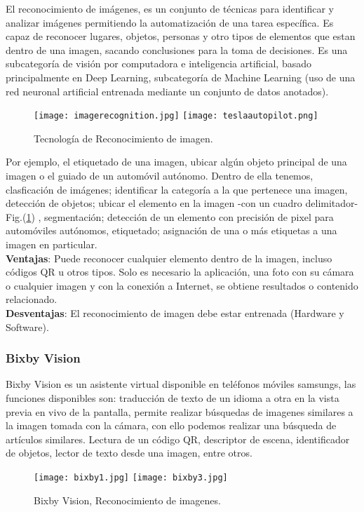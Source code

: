 El reconocimiento de imágenes, es un conjunto de técnicas para identificar y analizar imágenes permitiendo la automatización de una tarea específica. Es capaz de reconocer lugares, objetos, personas y otro tipos de elementos que estan dentro de una imagen, sacando conclusiones para la toma de decisiones. Es una subcategoría de visión por computadora e inteligencia artificial, basado principalmente en Deep Learning, subcategoría de Machine Learning (uso de una red neuronal artificial entrenada mediante un conjunto de datos anotados).\cite{deepomatic.com2021,Wu2015}

\begin{figure} 	
	\texttt{[image: imagerecognition.jpg]}
	\texttt{[image: teslaautopilot.png]}
	\caption{Tecnología de Reconocimiento de imagen.}
	\label{fig:Irecog}
\end{figure}

Por ejemplo, el etiquetado de una imagen, ubicar algún objeto principal de una imagen o el guiado de un automóvil autónomo.
Dentro de ella tenemos, clasficación de imágenes; identificar la categoría a la que pertenece una imagen, detección de objetos; ubicar el elemento en la imagen -con un cuadro delimitador- Fig.(\ref{fig:Irecog}) , segmentación; detección de un elemento con precisión de pixel para automóviles autónomos, etiquetado; asignación de una o más etiquetas a una imagen en particular.  \cite{deepomatic.com2021}
\\
\textbf{Ventajas}: Puede reconocer cualquier elemento dentro de la imagen, incluso códigos QR u otros tipos. Solo es necesario la aplicación, una foto con su cámara o cualquier imagen y con la conexión a Internet, se obtiene resultados o contenido relacionado. \cite{lens.google2021}
\\
\textbf{Desventajas}: El reconocimiento de imagen debe estar entrenada (Hardware y Software). \cite{deepomatic.com2021,Wu2015} 

\subsubsection{Bixby Vision}
Bixby Vision es un asistente virtual disponible en teléfonos móviles samsungs, las funciones disponibles son: traducción de texto de un idioma a otra en la vista previa en vivo de la pantalla, permite realizar búsquedas de imagenes similares a la imagen tomada con la cámara, con ello podemos realizar una búsqueda de artículos similares. Lectura de un código QR, descriptor de escena, identificador de objetos, lector de texto desde una imagen, entre otros. \cite{samsung.com2021}
\begin{figure} 	
	\texttt{[image: bixby1.jpg]}
	\texttt{[image: bixby3.jpg]}
	\caption{Bixby Vision, Reconocimiento de imagenes.}
	\label{fig:Irecog2}
\end{figure}

